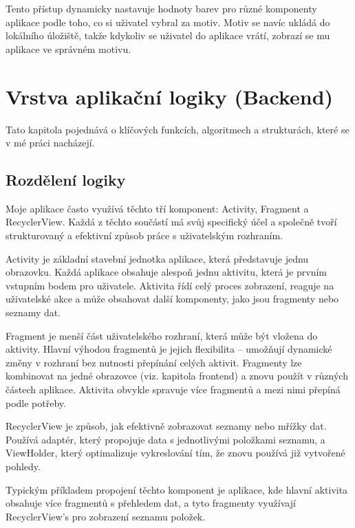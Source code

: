 Tento přístup dynamicky nastavuje hodnoty barev pro různé komponenty aplikace podle toho, co si uživatel vybral za motiv. Motiv se navíc ukládá do lokálního úložiště, takže kdykoliv se uživatel do aplikace vrátí, zobrazí se mu aplikace ve správném motivu.
\newpage
\section{Vrstva aplikační logiky (Backend)}
\hspace{14pt} Tato kapitola pojednává o klíčových funkcích, algoritmech a strukturách, které se v mé práci nacházejí.
\subsection{Rozdělení logiky}
\hspace{14pt} Moje aplikace často využívá těchto tří komponent: Activity, Fragment a RecyclerView. Každá z těchto součástí má svůj specifický účel a společně tvoří strukturovaný a efektivní způsob práce s uživatelským rozhraním.  

Activity je základní stavební jednotka aplikace, která představuje jednu obrazovku. Každá aplikace obsahuje alespoň jednu aktivitu, která je prvním vstupním bodem pro uživatele. Aktivita řídí celý proces zobrazení, reaguje na uživatelské akce a může obsahovat další komponenty, jako jsou fragmenty nebo seznamy dat.  

Fragment je menší část uživatelského rozhraní, která může být vložena do aktivity. Hlavní výhodou fragmentů je jejich flexibilita – umožňují dynamické změny v rozhraní bez nutnosti přepínání celých aktivit. Fragmenty lze kombinovat na jedné obrazovce (viz. kapitola frontend) a znovu použít v různých částech aplikace. Aktivita obvykle spravuje více fragmentů a mezi nimi přepíná podle potřeby.  

RecyclerView je způsob, jak efektivně zobrazovat seznamy nebo mřížky dat. Používá adaptér, který propojuje data s jednotlivými položkami seznamu, a ViewHolder, který optimalizuje vykreslování tím, že znovu používá již vytvořené pohledy.  

Typickým příkladem propojení těchto komponent je aplikace, kde hlavní aktivita obsahuje více fragmentů s přehledem dat, a tyto fragmenty využívají RecyclerView's pro zobrazení seznamu položek.  

\newpage

